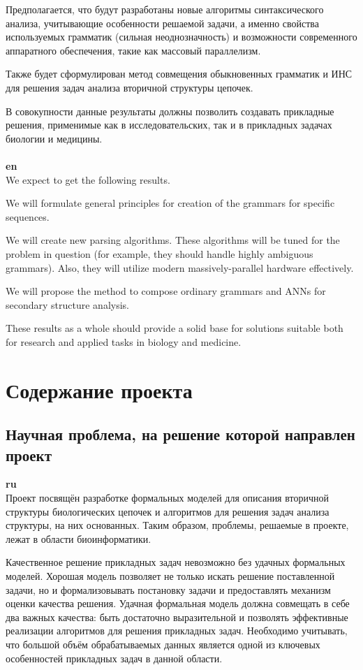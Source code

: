 \documentclass[12pt]{article}  %
\theoremstyle{remark}
\begin{document}
Предполагается, что будут разработаны новые алгоритмы синтаксического анализа, учитывающие особенности решаемой задачи, а именно свойства используемых грамматик (сильная неоднозначность) и возможности современного аппаратного обеспечения, такие как массовый параллелизм.

Также будет сформулирован метод совмещения обыкновенных грамматик и ИНС для решения задач анализа вторичной структуры цепочек.

В совокупности данные результаты должны позволить создавать прикладные решения, применимые как в исследовательских, так и в прикладных задачах биологии и медицины.
\\
\\
\textbf{en}\\
We expect to get the following results.

We will formulate general principles for creation of the grammars for specific sequences. 

We will create new parsing algorithms. These algorithms will be tuned for the  problem in question (for example, they should handle highly ambiguous grammars). Also, they will utilize modern massively-parallel hardware effectively.

We will propose the method to compose ordinary grammars and ANNs for secondary structure analysis.

These results as a whole should provide a solid base for solutions suitable both for research and applied tasks in biology and medicine.

\section{Содержание проекта}

\subsection{Научная проблема, на решение которой направлен проект}

\textbf{ru}\\
Проект посвящён разработке формальных моделей для описания вторичной структуры биологических цепочек и алгоритмов для решения задач анализа структуры, на них основанных. Таким образом, проблемы, решаемые в проекте, лежат в области биоинформатики.

Качественное решение прикладных задач невозможно без удачных формальных моделей. Хорошая модель позволяет не только искать решение поставленной задачи, но и формализовывать постановку задачи и предоставлять механизм оценки качества решения.
Удачная формальная модель должна совмещать в себе два важных качества: быть достаточно выразительной и позволять эффективные реализации алгоритмов для решения прикладных задач.
Необходимо учитывать, что большой объём обрабатываемых данных является одной из ключевых особенностей прикладных задач в данной области.
\end{document}
